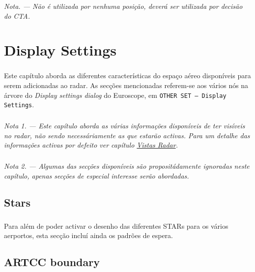 \documentclass[10pt]{report}
\begin{document}
\paragraph{} \textit{Nota. — Não é utilizada por nenhuma posição, deverá ser utilizada por decisão do CTA.}

\chapter{Display Settings}

\paragraph*{} Este capítulo aborda as diferentes características do espaço aéreo disponíveis para
serem adicionadas ao radar. As secções mencionadas referem-se aos vários nós na árvore do
\textit{Display settings dialog} do Euroscope, em \texttt{OTHER SET – Display Settings}.

\paragraph*{} \textit{Nota 1. — Este capítulo aborda as várias informações disponíveis de ter
visíveis no radar, não sendo necessáriamente as que estarão activas. Para um detalhe das
informações activas por defeito ver capítulo \hyperref[cap:vistas]{Vistas Radar}.}

\paragraph*{} \textit{Nota 2. — Algumas das secções disponíveis são propositádamente ignoradas
neste capítulo, apenas secções de especial interesse serão abordadas.}

\section{Stars}

\paragraph*{} Para além de poder activar o desenho das diferentes STARs para os vários aerportos,
esta secção incluí ainda os padrões de espera.

\section{ARTCC boundary}
\end{document}
